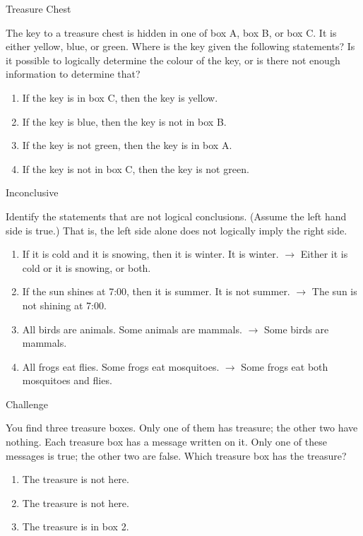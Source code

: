 \documentclass[a4paper,10pt]{report}
\begin{document}
\begin{problem}{Treasure Chest}

The key to a treasure chest is hidden in one of box A, box B, or box C. It is
either yellow, blue, or green. Where is the key given the following statements?
Is it possible to logically determine the colour of the key, or is there not
enough information to determine that?

 \begin{enumerate}
  \item If the key is in box C, then the key is yellow.
  \item If the key is blue, then the key is not in box B.
  \item If the key is not green, then the key is in box A.
  \item If the key is not in box C, then the key is not green.
 \end{enumerate}
\end{problem}

\begin{problem}{Inconclusive}

 Identify the statements that are not logical conclusions. (Assume the left hand
 side is true.) That is, the left side alone does not logically imply the right
 side.

 \begin{enumerate}[\hspace{.5cm}a.]
  \item If it is cold and it is snowing, then it is winter. It is winter. $\to$
  Either it is cold or it is snowing, or both.
  \item If the sun shines at 7:00, then it is summer. It is not summer. $\to$
  The sun is not shining at 7:00.
  \item All birds are animals. Some animals are mammals. $\to$ Some birds are
  mammals.
  \item All frogs eat flies. Some frogs eat mosquitoes. $\to$ Some frogs eat
  both mosquitoes and flies.
 \end{enumerate}

\end{problem}


\begin{problem}{Challenge}

You find three treasure boxes. Only one of them has treasure; the other two have
nothing. Each treasure box has a message written on it. Only one of these
messages is true; the other two are false. Which treasure box has the treasure?

\begin{enumerate}
\item The treasure is not here.
\item The treasure is not here.
\item The treasure is in box 2.
\end{enumerate}
\end{problem}
\end{document}
